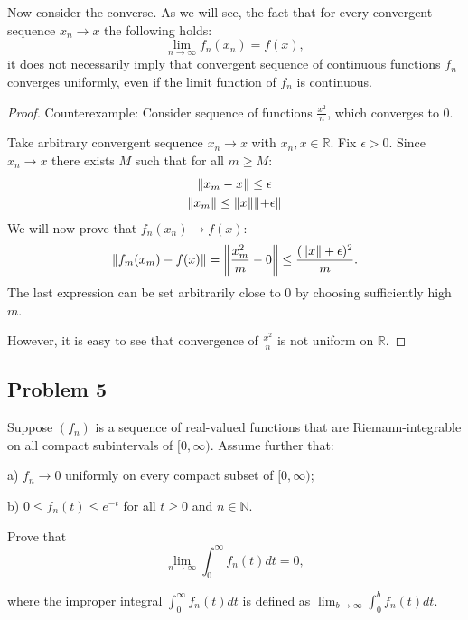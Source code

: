 \documentclass{article}
\newcommand{\R}{\mathbb{R}}
\newcommand{\N}{\mathbb{N}}
\DeclarePairedDelimiter{\norm}{\lVert}{\rVert}
\begin{document}
Now consider the converse. As we will see, the fact that for every convergent sequence $x_n \to x$ the following holds:
\[ \lim_{n \to \infty} f_n(x_n) = f(x), \]
it does not necessarily imply that convergent sequence of continuous functions $f_n$ converges uniformly, even if the limit function of $f_n$ is continuous.

\begin{proof}

Counterexample: Consider sequence of functions $\frac{x^2}{n}$, which converges to $0$.

Take arbitrary convergent sequence $x_n \to x$ with $x_n,x \in \R$. Fix $\epsilon>0$. Since $x_n \to x$ there exists $M$ such that for all $m \geq M$:
\begin{gather*}
    \norm*{ x_m - x } \leq \epsilon \\
    \norm*{ x_m } \leq \norm*{ x } \norm*{ + \epsilon }
\end{gather*}
We will now prove that $f_n(x_n) \to f(x)$:
\[ \norm*{ f_m(x_m) - f(x) } = \norm*{ \frac{x_m^2}{m} - 0 } \leq \frac{(\norm*{ x } + \epsilon)^2}{m}. \]
The last expression can be set arbitrarily close to $0$ by choosing sufficiently high $m$.

However, it is easy to see that convergence of $\frac{x^2}{n}$ is not uniform on $\R$.

\end{proof}


\subsection*{Problem 5}

\begin{tcolorbox}
Suppose $(f_n)$ is a sequence of real-valued functions that are Riemann-integrable on all compact subintervals of $[0,\infty)$. Assume further that:

a) $f_n \to 0$ uniformly on every compact subset of $[0,\infty)$;

b) $0 \leq f_n(t) \leq e^{-t}$ for all $t \geq 0$ and $n \in \N$.

Prove that
\[ \lim_{n \to \infty} \int_0^\infty f_n(t) dt = 0, \]

where the improper integral $\int_0^\infty f_n(t) dt$ is defined as  $\lim_{b\to\infty} \int_0^b f_n(t) dt$.
\end{tcolorbox}
\end{document}

